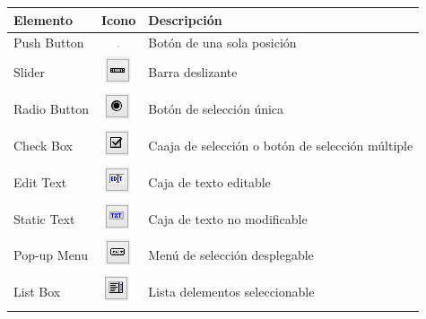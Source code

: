 \begin{table}[htb]
\begin{center}
\resizebox{10cm}{!} {
\begin{tabular}{|l|c|l|}
\hline
Elemento & Icono & Descripción \\
\hline \hline
Push Button&  \includegraphics[width=0.05\textwidth]{imagenes/iconosguide/pushbuton.png} & Botón de una sola posición \\ \hline
Slider &\includegraphics{imagenes/iconosguide/slider.png} & Barra deslizante \\ \hline
Radio Button&\includegraphics{imagenes/iconosguide/radiobuton.png}  &Botón de selección única \\ \hline
Check Box&\includegraphics{imagenes/iconosguide/check.png}   &Caaja de selección o botón de selección múltiple\\ \hline
Edit Text & \includegraphics{imagenes/iconosguide/edit.png} &Caja de texto editable  \\ \hline
Static Text& \includegraphics{imagenes/iconosguide/text.png} &Caja de texto no modificable  \\ \hline
Pop-up Menu& \includegraphics{imagenes/iconosguide/popup.png}  & Menú de selección desplegable\\ \hline
List Box&\includegraphics{imagenes/iconosguide/list.png}  &Lista delementos seleccionable \\ \hline

\end{tabular}}
\end{center}
\end{table}
